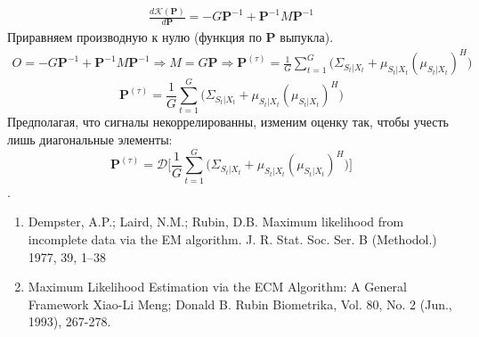 \documentclass[11pt]{article}
\begin{document}
\begin{equation*}
\begin{gathered}
\frac{d\mathcal{K}(\mathbf{P})}{d\mathbf{P}} = -G\mathbf{P}^{-1}+\mathbf{P}^{-1}M\mathbf{P}^{-1}
\end{gathered}
\end{equation*}
Приравняем производную к нулю (функция по $\mathbf{P}$ выпукла).
\begin{equation*}
\begin{gathered}
O = -G\mathbf{P}^{-1}+\mathbf{P}^{-1}M\mathbf{P}^{-1} \Rightarrow M =G\mathbf{P} \Rightarrow \mathbf{P}^{(\tau)} = \frac{1}{G} \sum_{t=1}^G \Big( \Sigma_{S_t|X_t} +  \mu_{S_t|X_t}  (\mu_{S_t|X_t})^H \Big)
\end{gathered}
\end{equation*}
\begin{equation}
\mathbf{P}^{(\tau)} = \frac{1}{G} \sum_{t=1}^G \Big( \Sigma_{S_t|X_t} +  \mu_{S_t|X_t}  (\mu_{S_t|X_t})^H \Big)
\end{equation}
Предполагая, что сигналы некоррелированны, изменим оценку так, чтобы учесть лишь диагональные элементы:
\begin{equation}
\mathbf{P}^{(\tau)} =  \mathcal{D} \bigg[\frac{1}{G}\sum_{t=1}^G \Big( \Sigma_{S_t|X_t} +  \mu_{S_t|X_t}  (\mu_{S_t|X_t})^H \Big)\bigg]
\end{equation}.
\clearpage
\begin{center}
\fontsize{16}{20}\selectfont {}
\end{center}
\begin{center}
\fontsize{14}{18}\selectfont {}
\end{center}
\begin{center}
\fontsize{14}{18}\selectfont {}
\end{center}
\begin{center}
\fontsize{14}{18}\selectfont {}
\end{center}
\begin{center}
\fontsize{14}{18}\selectfont {}
\end{center}
\clearpage
\begin{center}
\fontsize{16}{20}\selectfont {}
\end{center}
\begin{enumerate}
\item
Dempster, A.P.; Laird, N.M.; Rubin, D.B. Maximum likelihood from incomplete data via the EM algorithm. J. R. Stat. Soc. Ser. B
(Methodol.) 1977, 39, 1–38
\item
Maximum Likelihood Estimation via the ECM Algorithm: A General Framework Xiao-Li Meng; Donald B. Rubin Biometrika, Vol. 80, No. 2 (Jun., 1993), 267-278.
\end{enumerate}
\end{document}
